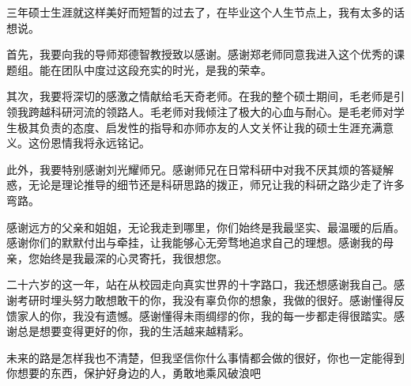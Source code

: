 
\begin{acknowledgements}
  三年硕士生涯就这样美好而短暂的过去了，在毕业这个人生节点上，我有太多的话想说。

首先，我要向我的导师郑德智教授致以感谢。感谢郑老师同意我进入这个优秀的课题组。能在团队中度过这段充实的时光，是我的荣幸。

其次，我要将深切的感激之情献给毛天奇老师。在我的整个硕士期间，毛老师是引领我跨越科研河流的领路人。毛老师对我倾注了极大的心血与耐心。是毛老师对学生极其负责的态度、启发性的指导和亦师亦友的人文关怀让我的硕士生涯充满意义。这份恩情我将永远铭记。

此外，我要特别感谢刘光耀师兄。感谢师兄在日常科研中对我不厌其烦的答疑解惑，无论是理论推导的细节还是科研思路的拨正，师兄让我的科研之路少走了许多弯路。

感谢远方的父亲和姐姐，无论我走到哪里，你们始终是我最坚实、最温暖的后盾。感谢你们的默默付出与牵挂，让我能够心无旁骛地追求自己的理想。感谢我的母亲，您始终是我最深的心灵寄托，我很想您。

二十六岁的这一年，站在从校园走向真实世界的十字路口，我还想感谢我自己。感谢考研时埋头努力敢想敢干的你，我没有辜负你的想象，我做的很好。感谢懂得反馈家人的你，我没有遗憾。感谢懂得未雨绸缪的你，我的每一步都走得很踏实。感谢总是想要变得更好的你，我的生活越来越精彩。

未来的路是怎样我也不清楚，但我坚信你什么事情都会做的很好，你也一定能得到你想要的东西，保护好身边的人，勇敢地乘风破浪吧
\end{acknowledgements}
